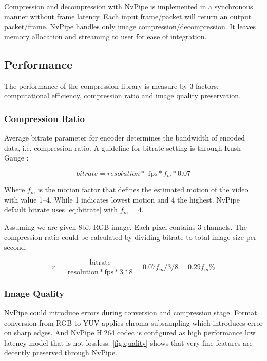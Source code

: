 \documentclass{vgtc}                          %
\begin{document}
Compression and decompression with NvPipe is implemented in a synchronous manner without frame latency. Each input frame/packet will return an output packet/frame. NvPipe handles only image compression/decompression. It leaves memory allocation and streaming to user for ease of integration.

\subsection{Performance}

The performance of the compression library is measure by 3 factors: computational efficiency, compression ratio and image quality preservation.

\subsubsection{Compression Ratio}

Average bitrate parameter for encoder determines the bandwidth of encoded data, i.e. compression ratio. A guideline for bitrate setting is through Kush Gauge \cite{iszaidyinvestigation}:

\begin{equation}
\label{eq:bitrate}
 bitrate = resolution * \text{ fps} * f_m * 0.07
\end{equation}

Where \(f_m\) is the motion factor that defines the estimated motion of the video with value \numrange{1}{4}. While 1 indicates lowest motion and 4 the highest. NvPipe default bitrate uses \cref{eq:bitrate} with \(f_m=4\).

Assuming we are given 8bit RGB image. Each pixel contains 3 channels. The compression ratio could be calculated by dividing bitrate to total image size per second.

\begin{equation}
\label{eq:compress_ratio}
 r = \frac{ \text{ bitrate}}{ \text{ resolution} * \text{fps} * 3 * 8} = 0.07f_m/3/8 = 0.29f_m\%
\end{equation}

\subsubsection{Image Quality}

NvPipe could introduce errors during conversion and compression stage. Format conversion from RGB to YUV applies chroma subsampling which introduces error on sharp edges. And NvPipe H.264 codec is configured as high performance low latency model that is not lossless. \cref{fig:quality} shows that very fine features are decently preserved through NvPipe.
\end{document}
